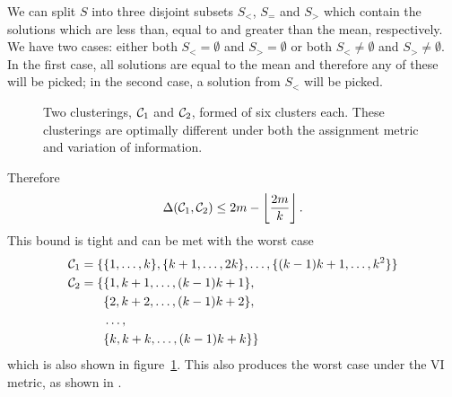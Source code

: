 We can split $S$ into three disjoint subsets $S_{<}$, $S_{=}$ and $S_{>}$
which contain the solutions which are less than, equal to and greater than the
mean, respectively.  We have two cases: either both $S_{<} = \emptyset$ and
$S_{>} = \emptyset$ or both $S_{<} \neq \emptyset$ and $S_{>} \neq \emptyset$.
In the first case, all solutions are equal to the mean and therefore any of
these will be picked; in the second case, a solution from $S_{<}$ will be
picked.

\begin{figure}
  \centering
  \caption{Two clusterings, $\mathcal{C}_1$ and $\mathcal{C}_2$, formed of six
    clusters each.  These clusterings are optimally different under both the
    assignment metric and variation of information.}
  \label{fig:worst-case}
\end{figure}

Therefore
\begin{equation*}
  \Delta(\mathcal{C}_1,\mathcal{C}_2) \leq 2m - \left\lfloor \frac{2m}{k} \right\rfloor.
\end{equation*}
This bound is tight and can be met with the worst case
\begin{align*}
  \mathcal{C}_1 = \{&\{1,\dotsc,k\},\{k+1,\dotsc,2k\},\dotsc,\{(k-1)k+1,\dotsc,k^2\}\} \\
  \mathcal{C}_2 = \{&\{1,k+1,\dotsc,(k-1)k+1\},\\
  &\{2,k+2,\dotsc,(k-1)k+2\},\\
  &\dotsc,\\
  &\{k,k+k,\dotsc,(k-1)k+k\}\}
\end{align*}
which is also shown in figure~\ref{fig:worst-case}.  This also produces the
worst case under the VI metric, as shown in \citep{meila-2007}.

